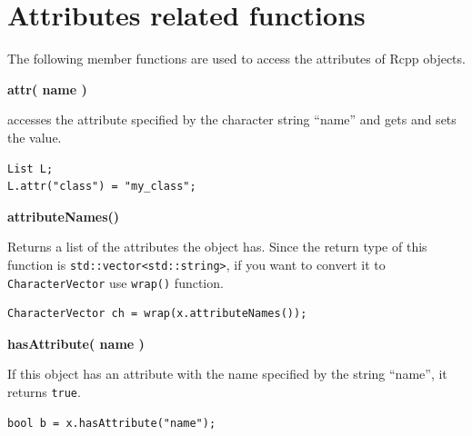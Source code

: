 \documentclass[]{book}
\begin{document}
\hypertarget{attributes-related-functions}{%
\section{Attributes related functions}\label{attributes-related-functions}}

The following member functions are used to access the attributes of Rcpp objects.

\textbf{attr( name )}

accesses the attribute specified by the character string ``name'' and gets and sets the value.

\begin{verbatim}
List L;
L.attr("class") = "my_class";
\end{verbatim}

\textbf{attributeNames()}

Returns a list of the attributes the object has. Since the return type of this function is \texttt{std::vector\textless{}std::string\textgreater{}}, if you want to convert it to \texttt{CharacterVector} use \texttt{wrap()} function.

\begin{verbatim}
CharacterVector ch = wrap(x.attributeNames());
\end{verbatim}

\textbf{hasAttribute( name )}

If this object has an attribute with the name specified by the string ``name'', it returns \texttt{true}.

\begin{verbatim}
bool b = x.hasAttribute("name");
\end{verbatim}
\end{document}
